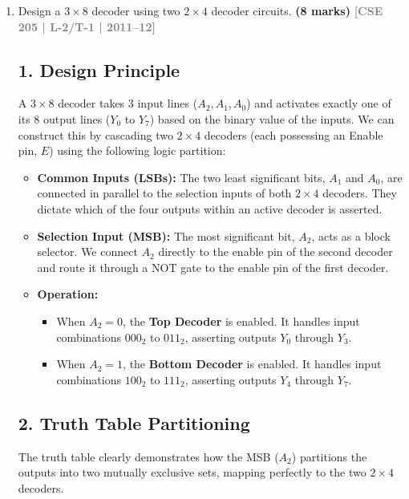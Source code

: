 \documentclass[12pt,a3paper]{article}
\newcommand{\yr}[1]{\hfill\textcolor{gray}{\small\textbf{[#1]}}}
\newcommand{\mk}[1]{\textcolor{orange!70!black}{\small\textbf{(#1 marks)}}}
\begin{document}
\begin{enumerate}
\begin{tcolorbox}[enhanced,breakable,ansbox,colback=cD!4,colframe=cD,boxrule=0.8pt,arc=5pt,title={\textbf{Answer}},fonttitle=\bfseries\color{white},colbacktitle=cD]
\begin{center}
\begin{circuitikz}[scale=0.9, transform shape, thick]
\end{circuitikz}
\end{center}

\end{tcolorbox}

\item Design a $3 \times 8$ decoder using two $2 \times 4$ decoder circuits.
\mk{8} \yr{CSE 205 | L-2/T-1 | 2011--12}

\begin{tcolorbox}[enhanced,breakable,ansbox,colback=cD!4,colframe=cD,boxrule=0.8pt,arc=5pt,title={\textbf{Answer}},fonttitle=\bfseries\color{white},colbacktitle=cD]

\subsection*{1. Design Principle}
A $3 \times 8$ decoder takes 3 input lines ($A_2, A_1, A_0$) and activates exactly one of its 8 output lines ($Y_0$ to $Y_7$) based on the binary value of the inputs. We can construct this by cascading two $2 \times 4$ decoders (each possessing an Enable pin, $E$) using the following logic partition:

\begin{itemize}
    \item \textbf{Common Inputs (LSBs):} The two least significant bits, $A_1$ and $A_0$, are connected in parallel to the selection inputs of both $2 \times 4$ decoders. They dictate which of the four outputs within an active decoder is asserted.
    \item \textbf{Selection Input (MSB):} The most significant bit, $A_2$, acts as a block selector. We connect $A_2$ directly to the enable pin of the second decoder and route it through a NOT gate to the enable pin of the first decoder.
    \item \textbf{Operation:} 
    \begin{itemize}
        \item When $A_2 = 0$, the \textbf{Top Decoder} is enabled. It handles input combinations $000_2$ to $011_2$, asserting outputs $Y_0$ through $Y_3$.
        \item When $A_2 = 1$, the \textbf{Bottom Decoder} is enabled. It handles input combinations $100_2$ to $111_2$, asserting outputs $Y_4$ through $Y_7$.
    \end{itemize}
\end{itemize}

\subsection*{2. Truth Table Partitioning}
The truth table clearly demonstrates how the MSB ($A_2$) partitions the outputs into two mutually exclusive sets, mapping perfectly to the two $2 \times 4$ decoders.


\end{tcolorbox}
\end{enumerate}
\end{document}
